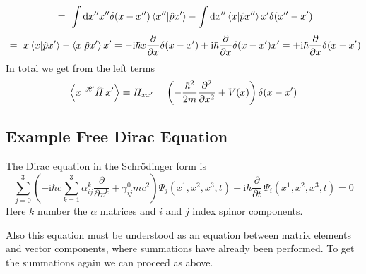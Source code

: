 \documentclass[12pt]{article}
\begin{document}
\begin{equation*}
\ =\ \int \mathrm{d}x'' x''\delta(x-x'') \bra{x''}\ket{\hat{p}x'} 
- \int \mathrm{d}x'' \bra{x}\ket{\hat{p}x''} x'\delta(x''-x')
\end{equation*}
\begin{equation*}
\ =\ x \bra{x}\ket{\hat{p}x'} - \bra{x}\ket{\hat{p}x'} x'
= -\mathrm {i} \hbar x \frac{\partial }{\partial x}\delta(x-x')
+\mathrm{i} \hbar \frac{\partial }{\partial x}\delta(x-x') x'
= +\mathrm{i} \hbar \frac{\partial }{\partial x}\delta(x-x')
\end{equation*}
In total we get from the left terms 
\begin{equation*}
\bra{x}\ket{^\mathscr{H}\hat{H}\,x'}\equiv H_{xx'} = 
\left(-\frac{\hbar^2}{2m} \frac {\partial^2}{\partial x^2}+V(x)\right) \delta(x-x')
\end{equation*}

\subsection{Example Free Dirac Equation}
The Dirac equation in the Schrödinger form is
\begin{equation*}
\sum_{j=0}^{3}\left(-\mathrm{i}\hbar c \sum_{k=1}^{3}\alpha^{k}_{ij}\frac{\partial }{\partial x^k}+\gamma^{0}_{ij} m c^2 \right)\Psi_j(x^1,x^2,x^3,t) 
- {\mathrm i}\hbar{\frac  {\partial }{\partial t}}\,\Psi_i(x^1,x^2,x^3,t) = 0
\end{equation*}
Here $k$ number the $\alpha$ matrices and $i$ and $j$ index spinor components.

Also this equation must be understood as an equation between matrix elements and vector components, where summations have already been performed. To get the summations again we can proceed as above. 
\end{document}
